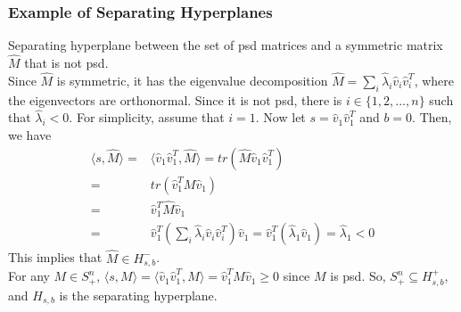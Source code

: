 \begin{frame}\frametitle{Example of Separating Hyperplanes}

    Separating hyperplane between the set of psd matrices and a symmetric matrix $\hat{M}$ that is not psd.\\
    Since $\hat{M}$ is symmetric, it has the eigenvalue decomposition $\hat{M} = \sum_{i} \hat{\lambda}_i \hat{v}_{i} \hat{v}_{i}^{T}$,
    where the eigenvectors are orthonormal.
    Since it is not psd, there is $i \in \{1,2, ... ,n\} $ such that $\hat{\lambda}_i < 0$.
    For simplicity, assume that $i = 1$. Now let $s = \hat{v}_1 \hat{v}_{1}^{T}$ and $b=0$.
    Then, we have
    \begin{align*}
        \langle s, \hat{M} \rangle ={ }& \langle \hat{v}_1 \hat{v}_{1}^{T} , \hat{M} \rangle = tr(\hat{M}\hat{v}_{1} \hat{v}_{1}^{T}) \\
        ={ }& tr(\hat{v}_{1}^{T} M \hat{v}_{1})\\
        ={ }& \hat{v}_{1}^{T} \hat{M} \hat{v}_{1}\\
        ={ }& \hat{v}_{1}^{T} (\sum_{i} \hat{\lambda}_i \hat{v}_{i} \hat{v}_{i}^{T}) \hat{v}_{1} = \hat{v}_{1}^{T} (\hat{\lambda}_1 \hat{v}_{1}) = \hat{\lambda}_1 < 0
    \end{align*}
    This implies that $\hat{M} \in H_{s,b}^{-}$.\\
    For any $M \in S_{+}^{n}$, $\langle s, M \rangle = \langle \hat{v}_1 \hat{v}_{1}^{T} , M \rangle = \hat{v}_{1}^{T} M \hat{v}_{1} \geq 0$ since $M$ is psd.
    So, $S_{+}^{n} \subseteq H_{s,b}^{+}$, and $H_{s,b}$ is the separating hyperplane.
\end{frame}


